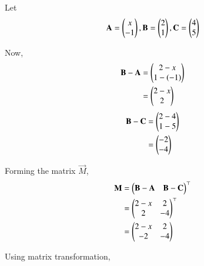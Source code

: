 Let 
\begin{align}
    \mathbf{A}= \begin{pmatrix}x\\-1\end{pmatrix} , \mathbf{B} = \begin{pmatrix}2\\1\end{pmatrix} , \mathbf{C} = \begin{pmatrix}4\\5\end{pmatrix}
\end{align}

Now,
\begin{align}
    \mathbf{B}-\mathbf{A} & = \begin{pmatrix}2-x\\1-(-1)\end{pmatrix}\\
                    & = \begin{pmatrix}2-x\\2\end{pmatrix}
\end{align}
\begin{align}
    \mathbf{B}-\mathbf{C} & = \begin{pmatrix}2-4\\1-5\end{pmatrix}\\
                    & = \begin{pmatrix}-2\\-4\end{pmatrix}
\end{align}

Forming the matrix $\vec{M}$,
\begin{align}
    \mathbf{M} & = \begin{pmatrix}\mathbf{B}-\mathbf{A}  &  \mathbf{B}-\mathbf{C}\end{pmatrix}^\top \\
            & =\begin{pmatrix}2-x & 2\\2 & -4\end{pmatrix}^\top\\
            & = \begin{pmatrix}2-x & 2 \\ -2 & -4\end{pmatrix}
\end{align}

Using matrix transformation,


